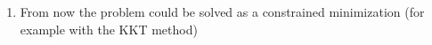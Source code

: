 \documentclass[a4paper,12pt]{article}
\makeatletter
\newenvironment{sistema}%
{\left\lbrace\begin{array}{@{}l@{}}}%
	{\end{array}\right.}
\makeatother
\begin{document}
{{\begin{enumerate}
\begin{gather*}
\begin{sistema}
						= \ \text{argmin}\left\{ \ x^2+u^2+\lambda_1 u + \lambda_2 (v+x) +\mu (xy+u) \ \right\}\\
						\text{with} \ \ \ \ u^2+v^2 \le 1 					
					\end{sistema}
				\end{gather*}
				Since not all the components of H depend on u or v then we can consider only:
				\begin{gather*}
					\text{minimize} \ \ \ \stackrel{\sim}{H} = u^2+\lambda_1 u + \lambda_2 v +\mu u\\
					\text{s.t.}	\ \ \ \ u^2+v^2 \le 1
				\end{gather*}
				\item From now the problem could be solved as a constrained minimization (for example with the KKT method)
			\end{enumerate}
	}}
	\newpage
\end{document}

